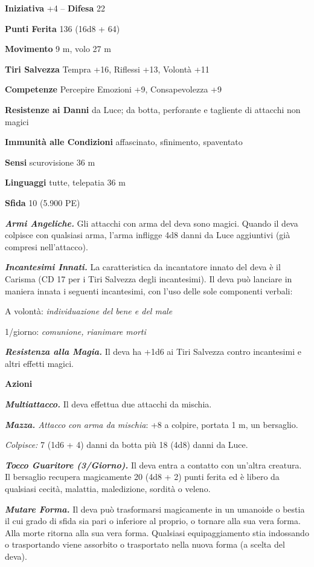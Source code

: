\begin{multicols}{2}
\textbf{Iniziativa} +4 -- \textbf{Difesa} 22

\textbf{Punti Ferita} 136 (16d8 + 64)

\textbf{Movimento} 9 m, volo 27 m

\textbf{Tiri Salvezza} Tempra +16, Riflessi +13, Volontà +11

\textbf{Competenze} Percepire Emozioni +9, Consapevolezza +9

\textbf{Resistenze ai Danni} da Luce; da botta, perforante e tagliente di attacchi non magici

\textbf{Immunità alle Condizioni} affascinato, sfinimento, spaventato

\textbf{Sensi} scurovisione 36 m

\textbf{Linguaggi} tutte, telepatia 36 m

\textbf{Sfida} 10 (5.900 PE)

\emph{\textbf{Armi Angeliche.}} Gli attacchi con arma del deva sono magici. Quando il deva colpisce con qualsiasi arma, l'arma infligge 4d8 danni da Luce aggiuntivi (già compresi nell'attacco).

\emph{\textbf{Incantesimi Innati.}} La caratteristica da incantatore innato del deva è il Carisma (CD 17 per i Tiri Salvezza degli incantesimi). Il deva può lanciare in maniera innata i seguenti incantesimi, con l'uso delle sole componenti verbali: 

A volontà: \emph{individuazione del bene e del male}

1/giorno: \emph{comunione, rianimare morti}

\emph{\textbf{Resistenza alla Magia.}} Il deva ha +1d6 ai Tiri Salvezza contro incantesimi e altri effetti magici.

\textbf{Azioni}

\emph{\textbf{Multiattacco.}} Il deva effettua due attacchi da mischia.

\emph{\textbf{Mazza.} Attacco con arma da mischia}: +8 a colpire, portata 1 m, un bersaglio.

\emph{Colpisce:} 7 (1d6 + 4) danni da botta più 18 (4d8) danni da Luce.

\emph{\textbf{Tocco Guaritore (3/Giorno).}} Il deva entra a contatto con un'altra creatura. Il bersaglio recupera magicamente 20 (4d8 + 2) punti ferita ed è libero da qualsiasi cecità, malattia, maledizione, sordità o veleno.

\emph{\textbf{Mutare Forma.}} Il deva può trasformarsi magicamente in un umanoide o bestia il cui grado di sfida sia pari o inferiore al proprio, o tornare alla sua vera forma. Alla morte ritorna alla sua vera forma. Qualsiasi equipaggiamento stia indossando o trasportando viene assorbito o trasportato nella nuova forma (a scelta del deva).


\end{multicols}
